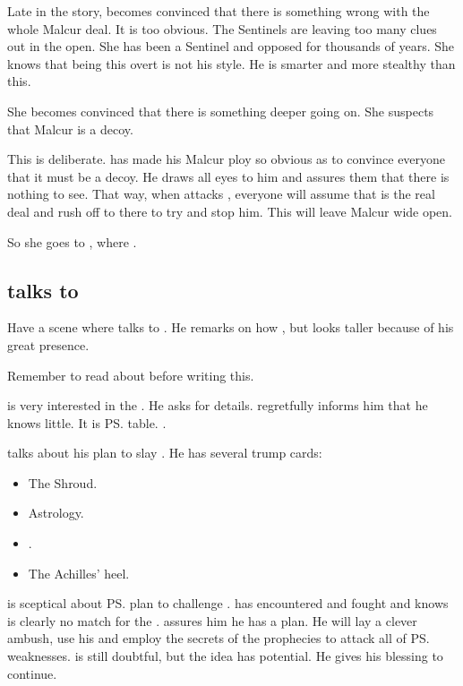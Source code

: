 \begin{garbage}
Late in the story, \Achsah{} becomes convinced that there is something wrong with the whole Malcur deal. 
It is too obvious. 
The Sentinels are leaving too many clues out in the open. 
She has been a Sentinel and opposed \Secherdamon{} for thousands of years. 
She knows that being this overt is not his style. 
He is smarter and more stealthy than this. 

She becomes convinced that there is something deeper going on. 
She suspects that Malcur is a decoy. 

This is deliberate. 
\Secherdamon{} has made his Malcur ploy so obvious as to convince everyone that it must be a decoy. 
He draws all eyes to him and assures them that there is nothing to see. 
That way, when \Nzessuacrith{} attacks \Forklin, everyone will assume that \Forklin{} is the real deal and rush off to there to try and stop him. 
This will leave Malcur wide open. 

So she goes to \Forklin{}, where . 








\subsection{\Teshrial{} talks to \Azraid}
Have a scene where \Teshrial{} talks to \hs{\Azraid}. 
He remarks on how , but looks taller because of his great presence. 

Remember to read about \hs{\Azraid} before writing this. 

\Azraid{} is very interested in the \vertexspike{}. 
He asks \Teshrial{} for details. 
\Teshrial{} regretfully informs him that he knows little. 
It is \ps{\Achsah} table. 
\Azraid{} . 

\Teshrial{} talks about his plan to slay \Ishnaruchaefir. 
He has several trump cards:
\begin{itemize}
  \item The Shroud.
  \item Astrology. 
  \item \Ghobaleth.
  \item The Achilles' heel. 
\end{itemize}

\Azraid{} is sceptical about \ps{\Teshrial} plan to challenge \Ishnaruchaefir.
\Azraid{} has encountered and fought \Ishnaruchaefir{} and knows \Teshrial{} is clearly no match for the \dragon. 
\Teshrial{} assures him he has a plan. 
He will lay a clever ambush, use his \ghobaleth{} and employ the secrets of the prophecies to attack all of \ps{\Ishnaruchaefir} weaknesses. 
\Azraid{} is still doubtful, but the idea has potential. 
He gives \Teshrial{} his blessing to continue. 


\end{garbage}
